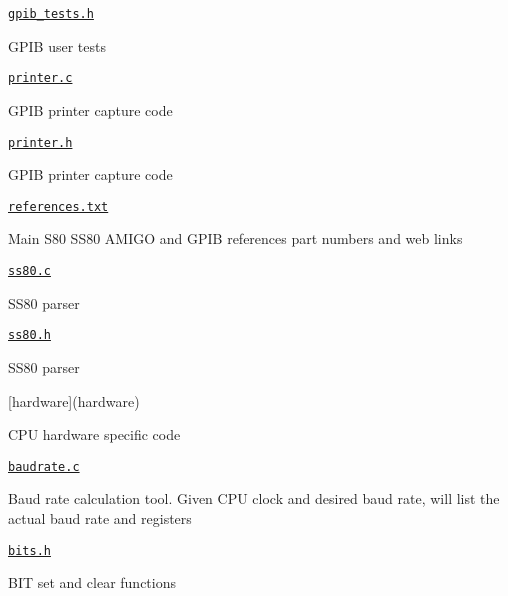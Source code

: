 \begin{DoxyItemize}
\begin{DoxyItemize}
\begin{DoxyItemize}
\end{DoxyItemize}
\item \href{gpib/gpib_tests.h}{\tt gpib\+\_\+tests.\+h}
\begin{DoxyItemize}
\item G\+P\+IB user tests
\end{DoxyItemize}
\item \href{gpib/printer.c}{\tt printer.\+c}
\begin{DoxyItemize}
\item G\+P\+IB printer capture code
\end{DoxyItemize}
\item \href{gpib/printer.h}{\tt printer.\+h}
\begin{DoxyItemize}
\item G\+P\+IB printer capture code
\end{DoxyItemize}
\item \href{gpib/references.txt}{\tt references.\+txt}
\begin{DoxyItemize}
\item Main S80 S\+S80 A\+M\+I\+GO and G\+P\+IB references part numbers and web links
\end{DoxyItemize}
\item \href{gpib/ss80.c}{\tt ss80.\+c}
\begin{DoxyItemize}
\item S\+S80 parser
\end{DoxyItemize}
\item \href{gpib/ss80.h}{\tt ss80.\+h}
\begin{DoxyItemize}
\item S\+S80 parser
\end{DoxyItemize}
\end{DoxyItemize}
\item \mbox{[}hardware\mbox{]}(hardware)
\begin{DoxyItemize}
\item C\+PU hardware specific code
\item \href{hardware/baudrate.c}{\tt baudrate.\+c}
\begin{DoxyItemize}
\item Baud rate calculation tool. Given C\+PU clock and desired baud rate, will list the actual baud rate and registers
\end{DoxyItemize}
\item \href{hardware/bits.h}{\tt bits.\+h}
\begin{DoxyItemize}
\item B\+IT set and clear functions

\end{DoxyItemize}
\end{DoxyItemize}
\end{DoxyItemize}
